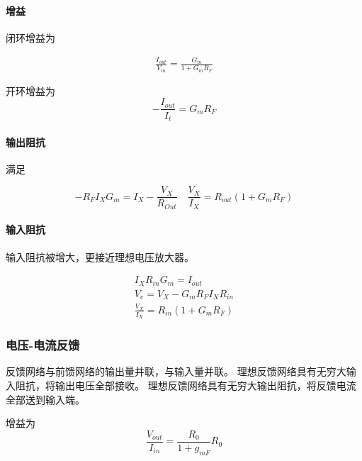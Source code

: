 \documentclass[cn,11pt,chinese,black,simple]{../elegantbook}
\begin{document}

\paragraph{增益}

闭环增益为 

\[\begin{array}{l}
    \frac{I_{o u t}}{V_{i n}}=\frac{G_{m}}{1+G_{m} R_{F}}
\end{array}\]


开环增益为 \[-\frac{I_{o u t}}{I_{t}}=G_{m} R_{F}\]

\paragraph{输出阻抗}

满足

\[-R_{F} I_{X} G_{m}=I_{X}-\frac{V_{X}}{R_{O u t}} \quad \frac{V_{X}}{I_{X}}=R_{o u t}\left(1+G_{m} R_{F}\right)\]


\paragraph{输入阻抗}

输入阻抗被增大，更接近理想电压放大器。

\[\begin{array}{l}
    I_{X} R_{i n} G_{m}=I_{o u t} \\
    V_{e}=V_{X}-G_{m} R_{F} I_{X} R_{i n} \\
    \frac{V_{X}}{I_{X}}=R_{i n}\left(1+G_{m} R_{F}\right)
\end{array}\]


\subsubsection{电压-电流反馈}

反馈网络与前馈网络的输出量并联，与输入量并联。
理想反馈网络具有无穷大输入阻抗，将输出电压全部接收。
理想反馈网络具有无穷大输出阻抗，将反馈电流全部送到输入端。


增益为 
\[\frac{V_{out}}{I_{in}} = \dfrac{R_0}{1 + g_{mF}} R_0\]

\end{document}
